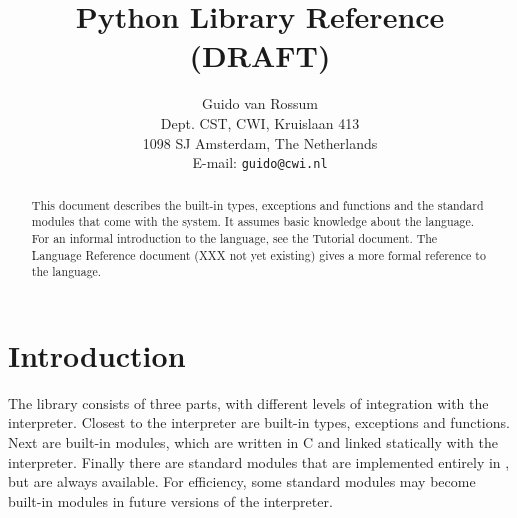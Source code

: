 

\newcommand{\itembreak}{
	\mbox{}\\*[0mm]
}

\title{\bf
	Python Library Reference \\
	(DRAFT)
}

\author{
	Guido van Rossum \\
	Dept. CST, CWI, Kruislaan 413 \\
	1098 SJ Amsterdam, The Netherlands \\
	E-mail: {\tt guido@cwi.nl}
}




\maketitle

\begin{abstract}

\noindent
This document describes the built-in types, exceptions and functions and
the standard modules that come with the {\Python} system.
It assumes basic knowledge about the {\Python} language.
For an informal introduction to the language, see the Tutorial document.
The Language Reference document (XXX not yet existing)
gives a more formal reference to the language.

\end{abstract}

\pagebreak

\tableofcontents

\pagebreak


\section{Introduction}

The {\Python} library consists of three parts, with different levels of
integration with the interpreter.
Closest to the interpreter are built-in types, exceptions and functions.
Next are built-in modules, which are written in C and linked statically
with the interpreter.
Finally there are standard modules that are implemented entirely in
{\Python}, but are always available.
For efficiency, some standard modules may become built-in modules in
future versions of the interpreter.

